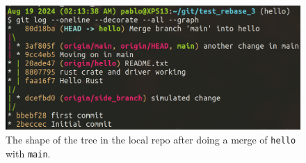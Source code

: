 \documentclass[10pt]{article}
\newcommand{\ket}[1]{$\left|#1\right\rangle$}
\newcommand{\Om}[1]{\small $\omega_{#1}$}
\newcommand{\De}[1]{$\Delta_{#1}$}
\newcommand{\Ga}[1]{$\Gamma_{#1}$}
\begin{document}
\begin{figure}
    \centering
    \includegraphics[width=\textwidth]{images/Tree_after_merge_main_on_hello.png}
    \caption{The shape of the tree in the local repo after doing a merge of \texttt{hello} with \texttt{main}.}
    \label{fig:tree-after-merge}
\end{figure}









\end{document}
